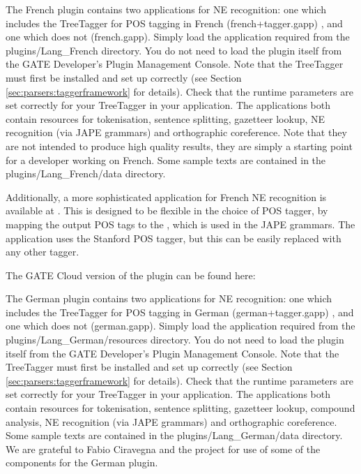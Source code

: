 
The French plugin contains two applications for NE recognition: one
which includes the TreeTagger for POS tagging in French
(french+tagger.gapp) , and one which does not (french.gapp). Simply
load the application required from the plugins/Lang\_French directory. You
do not need to load the plugin itself from the GATE Developer's Plugin
Management Console. Note that the TreeTagger must first be installed and set up
correctly (see Section \ref{sec:parsers:taggerframework} for
details). Check that the runtime parameters are set correctly for your
TreeTagger in your application. The applications both contain
resources for tokenisation, sentence splitting, gazetteer lookup, NE
recognition (via JAPE grammars) and orthographic coreference. Note
that they are not intended to produce high quality results, they are
simply a starting point for a developer working on French. Some sample
texts are contained in the plugins/Lang\_French/data directory.

Additionally, a more sophisticated application for French NE recognition is
available at .
This is designed to be flexible in the choice of POS tagger, by mapping the output POS 
tags to the , 
which is used in the JAPE grammars. The application uses the Stanford POS tagger, 
but this can be easily replaced with any other tagger.

The GATE Cloud version of the plugin can be found here: \\


The German plugin contains two applications for NE recognition: one
which includes the TreeTagger for POS tagging in German
(german+tagger.gapp) , and one which does not (german.gapp). Simply
load the application required from the plugins/Lang\_German/resources
directory. You do not need to load the plugin itself from the GATE
Developer's Plugin Management Console. Note that the TreeTagger must first be
installed and set up correctly (see
Section \ref{sec:parsers:taggerframework} for details). Check that the
runtime parameters are set correctly for your TreeTagger in your
application. The applications both contain resources for tokenisation,
sentence splitting, gazetteer lookup, compound analysis, NE
recognition (via JAPE grammars) and orthographic coreference. Some
sample texts are contained in the plugins/Lang\_German/data directory. We
are grateful to Fabio Ciravegna and
the  project for use
of some of the components for the German plugin. 

